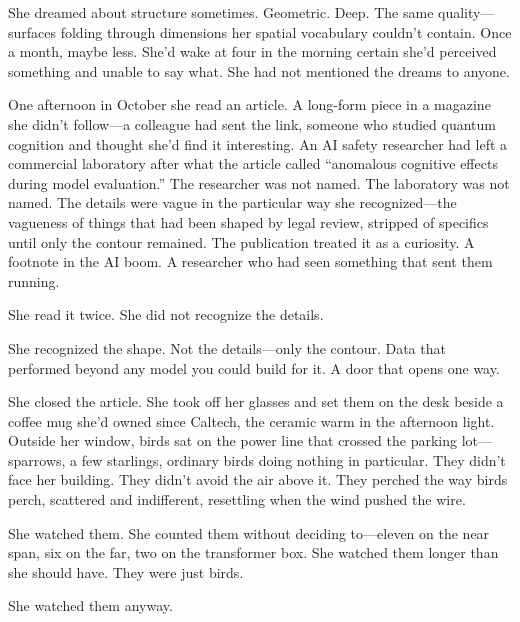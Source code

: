 \documentclass[12pt]{article}
\begin{document}
She dreamed about structure sometimes. Geometric. Deep. The same quality---surfaces folding through dimensions her spatial vocabulary couldn't contain. Once a month, maybe less. She'd wake at four in the morning certain she'd perceived something and unable to say what. She had not mentioned the dreams to anyone.

One afternoon in October she read an article. A long-form piece in a magazine she didn't follow---a colleague had sent the link, someone who studied quantum cognition and thought she'd find it interesting. An AI safety researcher had left a commercial laboratory after what the article called ``anomalous cognitive effects during model evaluation.'' The researcher was not named. The laboratory was not named. The details were vague in the particular way she recognized---the vagueness of things that had been shaped by legal review, stripped of specifics until only the contour remained. The publication treated it as a curiosity. A footnote in the AI boom. A researcher who had seen something that sent them running.

She read it twice. She did not recognize the details.

She recognized the shape. Not the details---only the contour. Data that performed beyond any model you could build for it. A door that opens one way.

She closed the article. She took off her glasses and set them on the desk beside a coffee mug she'd owned since Caltech, the ceramic warm in the afternoon light. Outside her window, birds sat on the power line that crossed the parking lot---sparrows, a few starlings, ordinary birds doing nothing in particular. They didn't face her building. They didn't avoid the air above it. They perched the way birds perch, scattered and indifferent, resettling when the wind pushed the wire.

She watched them. She counted them without deciding to---eleven on the near span, six on the far, two on the transformer box. She watched them longer than she should have. They were just birds.

She watched them anyway.
\end{document}
